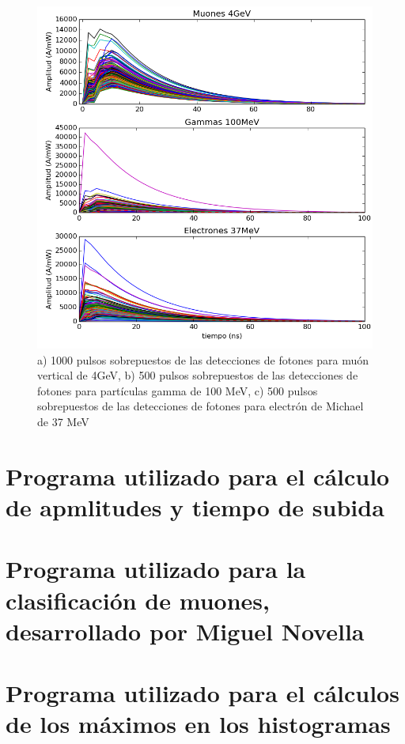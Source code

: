 \documentclass{book}
\begin{document}
\begin{figure}[h] %
\begin{center}
 \includegraphics[width=\linewidth]{2000Pulsos.png}
\caption{a) 1000 pulsos sobrepuestos de las detecciones de fotones para mu\'on vertical de 4GeV, b) 500 pulsos sobrepuestos de las detecciones de fotones para part\'iculas gamma de 100 MeV, c) 500 pulsos sobrepuestos de las detecciones de fotones para electr\'on de Michael de 37 MeV}
\end{center}
\end{figure}

\pagebreak
\section{Programa utilizado para el c\'alculo de apmlitudes y tiempo de subida}



\section{Programa utilizado para la clasificaci\'on de muones, desarrollado por Miguel Novella}



\section{Programa utilizado para el c\'alculos de los m\'aximos en los histogramas}


\end{document}
